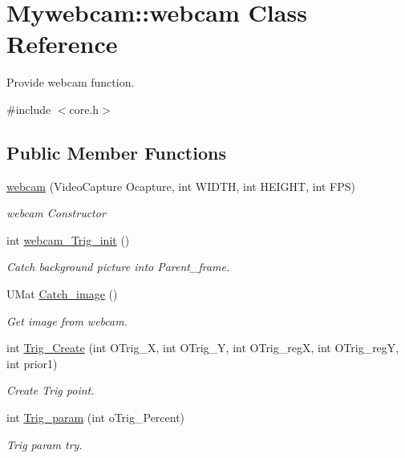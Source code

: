 \hypertarget{class_mywebcam_1_1webcam}{}\section{Mywebcam\+:\+:webcam Class Reference}
\label{class_mywebcam_1_1webcam}


Provide webcam function.  




{\ttfamily \#include $<$core.\+h$>$}

\subsection*{Public Member Functions}
\begin{DoxyCompactItemize}
\item 
\hyperlink{class_mywebcam_1_1webcam_a90ece1aab671095ee01fa9c34fa4dbd7}{webcam} (Video\+Capture Ocapture, int W\+I\+D\+TH, int H\+E\+I\+G\+HT, int F\+PS)
\begin{DoxyCompactList}\small\item\em webcam Constructor \end{DoxyCompactList}\item 
int \hyperlink{class_mywebcam_1_1webcam_a331edce2952af5995420c1ace205317c}{webcam\+\_\+\+Trig\+\_\+init} ()
\begin{DoxyCompactList}\small\item\em Catch background picture into Parent\+\_\+frame. \end{DoxyCompactList}\item 
U\+Mat \hyperlink{class_mywebcam_1_1webcam_a7a99d6f538b377e7af7021180bdfaef2}{Catch\+\_\+image} ()
\begin{DoxyCompactList}\small\item\em Get image from webcam. \end{DoxyCompactList}\item 
int \hyperlink{class_mywebcam_1_1webcam_a64834e308d75f64bcb4b833d415782d2}{Trig\+\_\+\+Create} (int O\+Trig\+\_\+X, int O\+Trig\+\_\+Y, int O\+Trig\+\_\+regX, int O\+Trig\+\_\+regY, int prior1)
\begin{DoxyCompactList}\small\item\em Create Trig point. \end{DoxyCompactList}\item 
int \hyperlink{class_mywebcam_1_1webcam_a7e205a9aa849cab1cb47513cdd46a02b}{Trig\+\_\+param} (int o\+Trig\+\_\+\+Percent)
\begin{DoxyCompactList}\small\item\em Trig param try. \end{DoxyCompactList}\item 

\end{DoxyCompactItemize}
